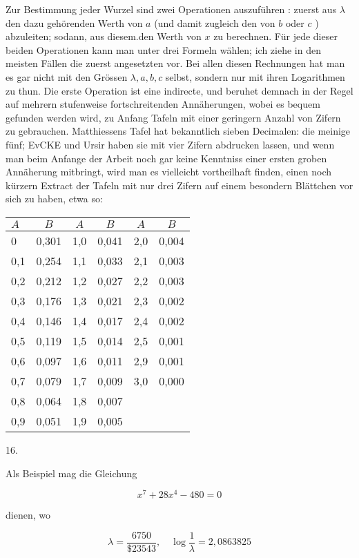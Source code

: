 \documentclass[10pt]{article}
\begin{document}
Zur Bestimmung jeder Wurzel sind zwei Operationen auszuführen : zuerst aus \(\lambda\) den dazu gehörenden Werth von \(a\) (und damit zugleich den von \(b\) oder \(c\) ) abzuleiten; sodann, aus diesem.den Werth von \(x\) zu berechnen. Für jede dieser beiden Operationen kann man unter drei Formeln wählen; ich ziehe in den meisten Fällen die zuerst angesetzten vor. Bei allen diesen Rechnungen hat man es gar nicht mit den Grössen \(\lambda, a, b, c\) selbst, sondern nur mit ihren Logarithmen zu thun. Die erste Operation ist eine indirecte, und beruhet demnach in der Regel auf mehrern stufenweise fortschreitenden Annäherungen, wobei es bequem gefunden werden wird, zu Anfang Tafeln mit einer geringern Anzahl von Zifern zu gebrauchen. Matthiessens Tafel hat bekanntlich sieben Decimalen: die meinige fünf; EvCKE und Ursir haben sie mit vier Zifern abdrucken lassen, und wenn man beim Anfange der Arbeit noch gar keine Kenntniss einer ersten groben Annäherung mitbringt, wird man es vielleicht vortheilhaft finden, einen noch kürzern Extract der Tafeln mit nur drei Zifern auf einem besondern Blättchen vor sich zu haben, etwa so:

\begin{center}
\begin{tabular}{l|c|c|c|c|c}
\(A\) & \(B\) & \(A\) & \(B\) & \(A\) & \(B\) \\
\hline
0 & 0,301 & 1,0 & 0,041 & 2,0 & 0,004 \\
0,1 & 0,254 & 1,1 & 0,033 & 2,1 & 0,003 \\
0,2 & 0,212 & 1,2 & 0,027 & 2,2 & 0,003 \\
0,3 & 0,176 & 1,3 & 0,021 & 2,3 & 0,002 \\
0,4 & 0,146 & 1,4 & 0,017 & 2,4 & 0,002 \\
0,5 & 0,119 & 1,5 & 0,014 & 2,5 & 0,001 \\
0,6 & 0,097 & 1,6 & 0,011 & 2,9 & 0,001 \\
0,7 & 0,079 & 1,7 & 0,009 & 3,0 & 0,000 \\
0,8 & 0,064 & 1,8 & 0,007 &  &  \\
0,9 & 0,051 & 1,9 & 0,005 &  &  \\
\end{tabular}
\end{center}

16.

Als Beispiel mag die Gleichung

\[
x^{7}+28 x^{4}-480=0
\]

dienen, wo

\[
\lambda=\frac{6750}{\$ 23543}, \quad \log \frac{1}{\lambda}=2,0863825
\]
\end{document}
